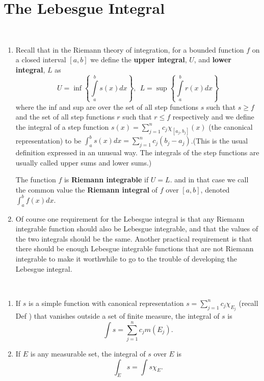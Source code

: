 \chapter{The Lebesgue Integral}
\begin{rmk} ~ %
	\begin{enumerate}
	\item Recall that in the Riemann theory of integration, for a bounded 
	function $f$ on a closed interval $[a,b]$ we define the \textbf{upper 
	integral}, $U$, and \textbf{lower integral}, $L$ as 
	\begin{equation*}
		U = \inf\left\{\int\limits_a^b s(x)dx\right\} ,~~ 
		L = \sup\left\{\int\limits_a^b r(x)dx\right\}
	\end{equation*}
	where the inf and sup are over the set of all step functions $s$ such that 
	$s \ge f$ and the set of all step functions $r$ such that $r \le f$ 
	respectively and we define the integral of a step function $s(x) = 
	\sum\limits_{j=1}^n c_j\chi_{[a_j,b_j]}(x)$ (the canonical representation) 
	to be $\int_a^b s(x) dx = \sum\limits_{j=1}^nc_j(b_j-a_j)$.(This is the 
	usual definition expressed in an unusual way. The integrals of the step 
	functions are usually called upper sums and lower sums.)

	The function $f$ is \textbf{Riemann integrable} if $U = L$. and in that 
	case we call the common value the \textbf{Riemann integral} of $f$ over 
	$[a,b]$, denoted $\int_a^bf(x)dx$. 
	\item Of course one requirement for the Lebesgue integral is that any 
	Riemann integrable function should also be Lebesgue integrable, and that 
	the values of the two integrals should be the same. Another practical 
	requirement is that there should be enough Lebesgue integrable functions 
	that are not Riemann integrable to make it worthwhile to go to the trouble 
	of developing the Lebesgue integral. 
	\end{enumerate}
\end{rmk}

\begin{defn}\label{d:integral} ~ %
\begin{enumerate}
	\item If $s$ is a simple function with canonical representation 
	$s = \sum\limits_{j=1}^n c_j\chi_{E_j}$ 
	(recall Def ) that vanishes outside a set of finite 
	measure, the integral of $s$ is 
	\begin{equation*}
		\int s = \sum\limits_{j=1}^n c_j m(E_j).
	\end{equation*}
	\item If $E$ is any measurable set, the integral of $s$ over $E$ is 
	\begin{equation*}
		\int_E s = \int s\chi_E. 
	\end{equation*}
\end{enumerate}
\end{defn}

